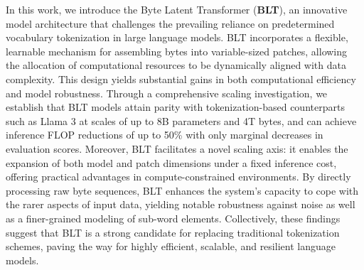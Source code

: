 In this work, we introduce the Byte Latent Transformer (\textbf{BLT}), an innovative model architecture that challenges the prevailing reliance on predetermined vocabulary tokenization in large language models. BLT incorporates a flexible, learnable mechanism for assembling bytes into variable-sized patches, allowing the allocation of computational resources to be dynamically aligned with data complexity. This design yields substantial gains in both computational efficiency and model robustness. Through a comprehensive scaling investigation, we establish that BLT models attain parity with tokenization-based counterparts such as Llama 3 at scales of up to 8B parameters and 4T bytes, and can achieve inference FLOP reductions of up to 50\% with only marginal decreases in evaluation scores. Moreover, BLT facilitates a novel scaling axis: it enables the expansion of both model and patch dimensions under a fixed inference cost, offering practical advantages in compute-constrained environments. By directly processing raw byte sequences, BLT enhances the system’s capacity to cope with the rarer aspects of input data, yielding notable robustness against noise as well as a finer-grained modeling of sub-word elements. Collectively, these findings suggest that BLT is a strong candidate for replacing traditional tokenization schemes, paving the way for highly efficient, scalable, and resilient language models.

